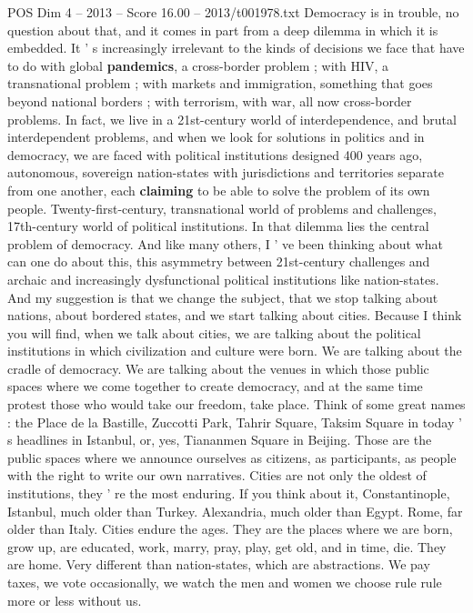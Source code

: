 \begin{textsample}{POS Dim 4 – 2013 – Score 16.00 – 2013/t001978.txt}  \label{ex:f4_pos_077}
Democracy is in trouble, no question about that, and it comes in part from a deep dilemma in which it is embedded.
It ' s increasingly irrelevant to the kinds of decisions we face that have to do with global \textbf{pandemics}, a cross-border problem ; with HIV, a transnational problem ; with markets and immigration, something that goes beyond national borders ; with terrorism, with war, all now cross-border problems.
In fact, we live in a 21st-century world of interdependence, and brutal interdependent problems, and when we look for solutions in politics and in democracy, we are faced with political institutions designed 400 years ago, autonomous, sovereign nation-states with jurisdictions and territories separate from one another, each \textbf{claiming} to be able to solve the problem of its own people.
Twenty-first-century, transnational world of problems and challenges, 17th-century world of political institutions.
In that dilemma lies the central problem of democracy.
And like many others, I ' ve been thinking about what can one do about this, this asymmetry between 21st-century challenges and archaic and increasingly dysfunctional political institutions like nation-states.
And my suggestion is that we change the subject, that we stop talking about nations, about bordered states, and we start talking about cities.
Because I think you will find, when we talk about cities, we are talking about the political institutions in which civilization and culture were born.
We are talking about the cradle of democracy.
We are talking about the venues in which those public spaces where we come together to create democracy, and at the same time protest those who would take our freedom, take place.
Think of some great names : the Place de la Bastille, Zuccotti Park, Tahrir Square, Taksim Square in today ' s headlines in Istanbul, or, yes, Tiananmen Square in Beijing.
Those are the public spaces where we announce ourselves as citizens, as participants, as people with the right to write our own narratives.
Cities are not only the oldest of institutions, they ' re the most enduring.
If you think about it, Constantinople, Istanbul, much older than Turkey.
Alexandria, much older than Egypt.
Rome, far older than Italy.
Cities endure the ages.
They are the places where we are born, grow up, are educated, work, marry, pray, play, get old, and in time, die.
They are home.
Very different than nation-states, which are abstractions.
We pay taxes, we vote occasionally, we watch the men and women we choose rule rule more or less without us.

\end{textsample}
